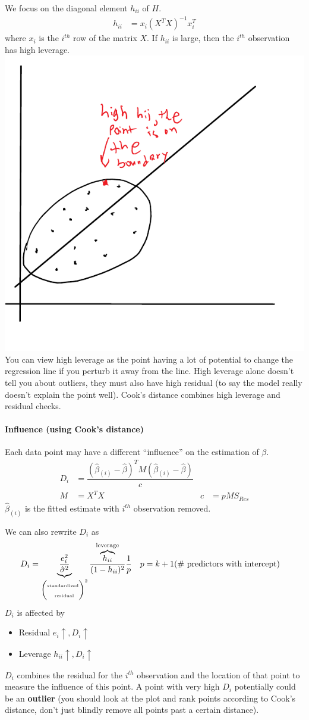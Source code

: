 \documentclass[12 pt]{article}
\begin{document}
We focus on the diagonal element $h_{ii}$ of $H$.
\begin{align*}
  h_{ii} & = x_i (X^TX)^{-1}x_i^T
\end{align*}
where $x_i$ is the $i^{th}$ row of the matrix $X$. If $h_{ii}$ is
large, then the $i^{th}$ observation has high leverage.
\\\includegraphics[width=.5\textwidth]{34.pdf}
\\ You can view high leverage as the point having a lot of potential
to change the regression line if you perturb it away from the
line. High leverage alone doesn't tell you about outliers, they must
also have high residual (to say the model really doesn't explain the
point well). Cook's distance combines high leverage and residual checks.
\paragraph{Influence (using Cook's distance)}
Each data point may have a different ``influence'' on the estimation
of $\beta$.
\begin{align*}
  D_i & = \dfrac{(\hat{\beta}_{(i)}-\hat{\beta})^TM(\hat{\beta}_{(i)} - \hat{\beta})}{c}
  \\ M & = X^TX & c & = pMS_{Res}
\end{align*}
  $\hat{\beta}_{(i)}$ is the fitted estimate with $i^{th}$
  observation removed.

  We can also rewrite $D_i$ as
  \begin{align*}
    D_i & =
          \underbrace{\frac{e_i^2}{\hat{\sigma}^2}}_{\begin{pmatrix}\text{\tiny
                standardized}\\\text{ \tiny residual}\end{pmatrix}^2}
    \frac{\overbrace{h_{ii}}^{\text{leverage}}}{(1-h_{ii})^2}\frac{1}{p}
        & p & = k+1 (\text{\# predictors with intercept})
  \end{align*}
  $D_i$ is affected by
  \begin{itemize}
  \item Residual $e_i \uparrow, D_i \uparrow$
  \item Leverage $h_{ii} \uparrow, D_i \uparrow$
  \end{itemize}
  $D_i$ combines the residual for the $i^{th}$ observation and the
  location of that point to measure the influence of this point. A
  point with very high $D_i$ potentially could be an \textbf{outlier}
  (you should look at the plot and rank points according to Cook's
  distance, don't just blindly remove all points past a certain distance).
\end{document}
